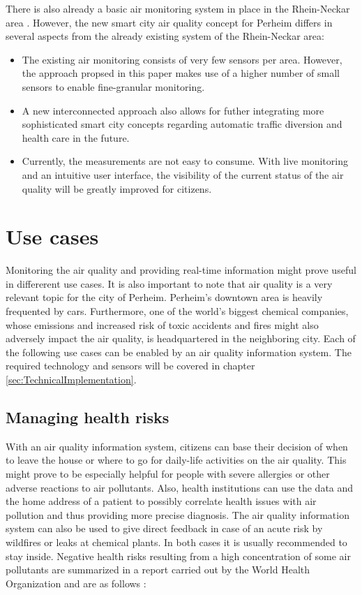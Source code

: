 \documentclass[conference]{IEEEtran}
\begin{document}
There is also already a basic air monitoring system in place in the Rhein-Neckar area \cite{LandesanstaltfurUmweltBadenWurttemberg}.
However, the new smart city air quality concept for Perheim differs in several aspects from the already existing system of the Rhein-Neckar area:
\begin{itemize} 
\item The existing air monitoring consists of very few sensors per area. However, the approach propsed in this paper makes use of a higher number of small sensors to enable fine-granular monitoring.
\item A new interconnected approach also allows for futher integrating more sophisticated smart city concepts regarding automatic traffic diversion and health care in the future.
\item Currently, the measurements are not easy to consume. With live monitoring and an intuitive user interface, the visibility of the current status of the air quality will be greatly improved for citizens.
\end{itemize} 

\section{Use cases}
Monitoring the air quality and providing real-time information might prove useful in differerent use cases. It is also important to note that air quality is a very relevant topic for the city of Perheim. Perheim's downtown area is heavily frequented by cars. Furthermore, one of the world's biggest chemical companies, whose emissions and increased risk of toxic accidents and fires might also adversely impact the air quality, is headquartered in the neighboring city.
\newline \newline
Each of the following use cases can be enabled by an air quality information system. The required technology and sensors will be covered in chapter \ref{sec:TechnicalImplementation}.

\subsection{Managing health risks}
With an air quality information system, citizens can base their decision of when to leave the house or where to go for daily-life activities on the air quality. This might prove to be especially helpful for people with severe allergies or other adverse reactions to air pollutants. Also, health institutions can use the data and the home address of a patient to possibly correlate health issues with air pollution and thus providing more precise diagnosis. The air quality information system can also be used to give direct feedback in case of an acute risk by wildfires or leaks at chemical plants. In both cases it is usually recommended to stay inside. Negative health risks resulting from a high concentration of some air pollutants are summarized in a report carried out by the World Health Organization and are as follows \cite{WorldHealthOrganization.2013}:
\end{document}

